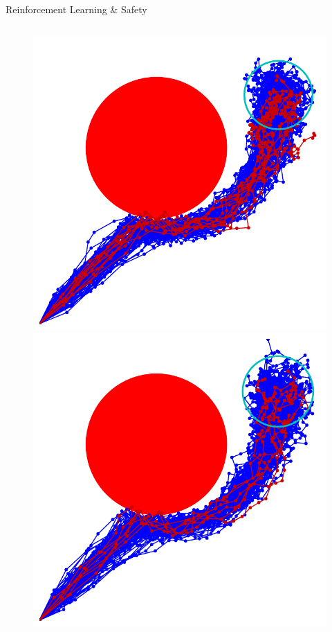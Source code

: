 \documentclass[lecture]{beamer}
\begin{document}
\begin{frame}{\normalsize Reinforcement Learning \& Safety}
\begin{columns}
\begin{overlayarea}{\textwidth}{.55\textheight}
\begin{figure}
{	}
	      \only<11>
        {
        \center
	\includegraphics[width=1\textwidth,clip]{Codes/RL/RLSafety8.pdf}
	}
	      \only<12>
        {
        \center
	\includegraphics[width=1\textwidth,clip]{Codes/RL/RLSafety9.pdf}
}
\end{figure}
\end{overlayarea}
\end{columns}
\end{frame}
\end{document}
